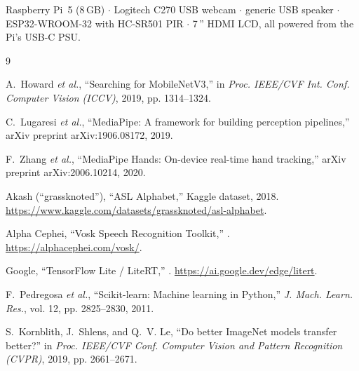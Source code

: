 \documentclass[sigconf,nonacm]{acmart}
\begin{document}
Raspberry Pi~5 (8\,GB) $\cdot$ Logitech C270 USB webcam $\cdot$ generic USB
speaker $\cdot$ ESP32-WROOM-32 with HC-SR501 PIR $\cdot$ 7\,'' HDMI LCD,
all powered from the Pi's USB-C PSU.

\begin{thebibliography}{9}

A.~Howard \emph{et al.},
\newblock ``Searching for MobileNetV3,''
\newblock in \emph{Proc. IEEE/CVF Int. Conf. Computer Vision (ICCV)}, 2019,
  pp. 1314--1324.

C.~Lugaresi \emph{et al.},
\newblock ``MediaPipe: A framework for building perception pipelines,''
\newblock arXiv preprint arXiv:1906.08172, 2019.

F.~Zhang \emph{et al.},
\newblock ``MediaPipe Hands: On-device real-time hand tracking,''
\newblock arXiv preprint arXiv:2006.10214, 2020.

Akash (``grassknoted''),
\newblock ``ASL Alphabet,''
\newblock Kaggle dataset, 2018.
  \url{https://www.kaggle.com/datasets/grassknoted/asl-alphabet}.

Alpha Cephei,
\newblock ``Vosk Speech Recognition Toolkit,''
.
  \url{https://alphacephei.com/vosk/}.

Google,
\newblock ``TensorFlow Lite / LiteRT,''
.
  \url{https://ai.google.dev/edge/litert}.

F.~Pedregosa \emph{et al.},
\newblock ``Scikit-learn: Machine learning in Python,''
\newblock \emph{J. Mach. Learn. Res.}, vol. 12, pp. 2825--2830, 2011.

S.~Kornblith, J.~Shlens, and Q.~V. Le,
\newblock ``Do better ImageNet models transfer better?''
\newblock in \emph{Proc. IEEE/CVF Conf. Computer Vision and Pattern Recognition
  (CVPR)}, 2019, pp. 2661--2671.

\end{thebibliography}
\end{document}
